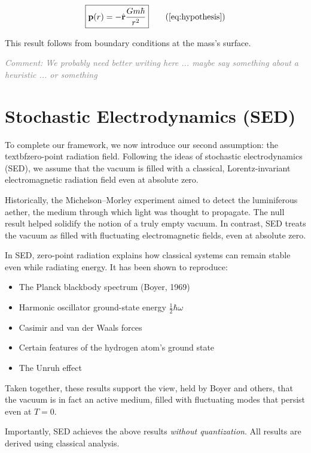 \documentclass {article}
\renewcommand\vec{\mathbf}
\let\OldHat\hat
\renewcommand{\hat}[1]{\OldHat{\mathbf{#1}}}
\newcommand{\comment}[1]{\textcolor{gray}{\small\textit{Comment: #1}}}
\begin{document}
\begin{equation}
\boxed{
	\vec{p}(r) = -\hat{r} \frac{G m \hbar}{r^2}
}
\tag{\ref{eq:hypothesis}}
\end{equation}

This result follows from boundary conditions at the mass’s surface.

\comment{We probably need better writing here ... maybe say something about a heuristic ... or something}

\section{Stochastic Electrodynamics (SED)}

To complete our framework, we now introduce our second assumption:  the textbf{zero-point radiation field}. Following the ideas of stochastic electrodynamics (SED), we assume that the vacuum is filled with a classical, Lorentz-invariant electromagnetic radiation field even at absolute zero. 

Historically, the Michelson–Morley experiment aimed to detect the luminiferous aether, the medium through which light was thought to propagate. The null result helped solidify the notion of a truly empty vacuum. In contrast, SED treats the vacuum as filled with fluctuating electromagnetic fields, even at absolute zero.

In SED, zero-point radiation explains how classical systems can remain stable even while radiating energy. It has been shown to reproduce:
\begin{itemize}
	\item The Planck blackbody spectrum (Boyer, 1969) \cite{boyer1969}
	\item Harmonic oscillator ground-state energy \( \tfrac{1}{2} \hbar \omega \) \cite{cole2003}
	\item Casimir and van der Waals forces \cite{boyer1975}
	\item Certain features of the hydrogen atom’s ground state \cite{puthoff1987}
	\item The Unruh effect \cite{boyer1980}
\end{itemize}

Taken together, these results support the view, held by Boyer and others, that the vacuum is in fact an active medium, filled with fluctuating modes that persist even at \( T = 0 \).

Importantly, SED achieves the above results  \emph{without quantization}. All results are derived using classical analysis.
\end{document}
